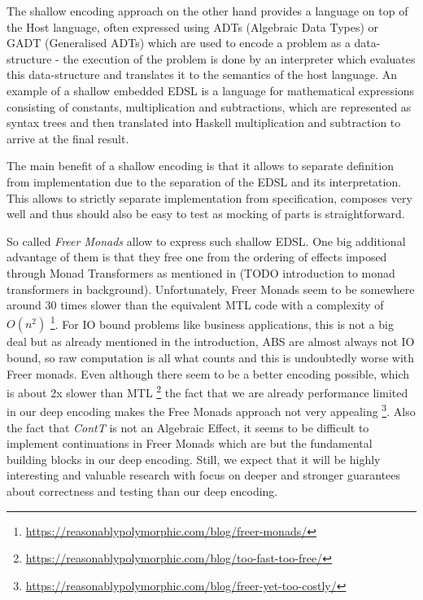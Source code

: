 The shallow encoding approach on the other hand provides a language on top of the Host language, often expressed using ADTs (Algebraic Data Types) or GADT (Generalised ADTs) which are used to encode a problem as a data-structure - the execution of the problem is done by an interpreter which evaluates this data-structure and translates it to the semantics of the host language. An example of a shallow embedded EDSL is a language for mathematical expressions consisting of constants, multiplication and subtractions, which are represented as syntax trees and then translated into Haskell multiplication and subtraction to arrive at the final result.

The main benefit of a shallow encoding is that it allows to separate definition from implementation due to the separation of the EDSL and its interpretation. This allows to strictly separate implementation from specification, composes very well and thus should also be easy to test as mocking of parts is straightforward.

\medskip

So called \textit{Freer Monads} \cite{rivas_notions_2014} allow to express such shallow EDSL. One big additional advantage of them is that they free one from the ordering of effects imposed through Monad Transformers as mentioned in (TODO introduction to monad transformers in background). Unfortunately, Freer Monads seem to be somewhere around 30 times slower than the equivalent MTL code with a complexity of $O(n^2)$ \footnote{\url{https://reasonablypolymorphic.com/blog/freer-monads/}}. For IO bound problems like business applications, this is not a big deal but as already mentioned in the introduction, ABS are almost always not IO bound, so raw computation is all what counts and this is undoubtedly worse with Freer monads. Even although there seem to be a better encoding possible, which is about 2x slower than MTL \footnote{\url{https://reasonablypolymorphic.com/blog/too-fast-too-free/}} the fact that we are already performance limited in our deep encoding makes the Free Monads approach not very appealing \footnote{\url{https://reasonablypolymorphic.com/blog/freer-yet-too-costly/}}. Also the fact that \textit{ContT} is not an Algebraic Effect, it seems to be difficult to implement continuations in Freer Monads which are but the fundamental building blocks in our deep encoding. Still, we expect that it will be highly interesting and valuable research with focus on deeper and stronger guarantees about correctness and testing than our deep encoding.


